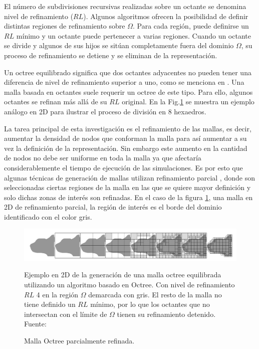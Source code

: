 El número de subdivisiones recursivas realizadas sobre un octante se denomina nivel de refinamiento ($RL$). Algunos algoritmos ofrecen la posibilidad de definir distintas regiones de refinamiento sobre $\Omega$. Para cada región, puede definirse un $RL$ mínimo y un octante puede pertenecer a varias regiones. Cuando un octante se divide y algunos de sus hijos se sitúan completamente fuera del dominio $\Omega$, su proceso de refinamiento se detiene y se eliminan de la representación.

Un octree equilibrado significa que dos octantes adyacentes no pueden tener una diferencia de nivel de refinamiento superior a uno, como se menciona en \cite{daines2018repairing}. Una malla basada en octantes suele requerir un octree de este tipo. Para ello, algunos octantes se refinan más allá de su $RL$ original. En la Fig.\ref{fig:octree-mesh} se muestra un ejemplo análogo en 2D para ilustrar el proceso de división en 8 hexaedros.

La tarea principal de esta investigación es el refinamiento de las mallas, es decir, aumentar la densidad de nodos que conforman la malla para así aumentar a su vez la definición de la representación. Sin embargo este aumento en la cantidad de nodos no debe ser uniforme en toda la malla ya que afectaría considerablemente el tiempo de ejecución de las simulaciones. Es por esto que algunas técnicas de generación de mallas utilizan refinamiento parcial \cite{lobos2015mixed}, donde son seleccionadas ciertas regiones de la malla en las que se quiere mayor definición y solo dichas zonas de interés son refinadas. En el caso de la figura \ref{fig:octree-mesh}, una malla en 2D de refinamiento parcial, la región de interés es el borde del dominio identificado con el color gris.

\begin{figure}[!ht]
    \centering
    \includegraphics[width=1.0\textwidth]{figures/divison-process.png}
    \caption{\label{fig:octree-mesh} Malla Octree parcialmente refinada.}
    \small{Ejemplo en 2D de la generación de una malla octree equilibrada utilizando un algoritmo basado en Octree.
    Con nivel de refinamiento $RL$ 4 en la región $\Omega$ demarcada con gris. El resto de la malla no tiene definido un $RL$ mínimo, por lo que los octantes que no intersectan con el límite de $\Omega$ tienen su refinamiento detenido.} \\
    Fuente: \cite{lobos2015mixed}
\end{figure}

